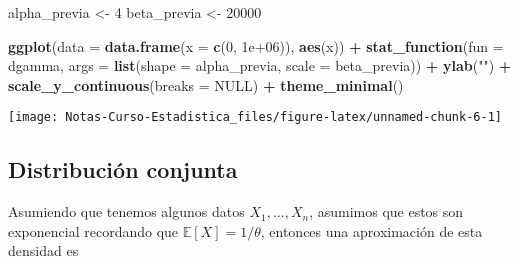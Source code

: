 \documentclass[
  12pt,
]{book}
\newenvironment{Shaded}{\begin{snugshade}}{\end{snugshade}}
\newcommand{\DataTypeTok}[1]{\textcolor[rgb]{0.13,0.29,0.53}{#1}}
\newcommand{\DecValTok}[1]{\textcolor[rgb]{0.00,0.00,0.81}{#1}}
\newcommand{\FloatTok}[1]{\textcolor[rgb]{0.00,0.00,0.81}{#1}}
\newcommand{\KeywordTok}[1]{\textcolor[rgb]{0.13,0.29,0.53}{\textbf{#1}}}
\newcommand{\NormalTok}[1]{#1}
\newcommand{\OperatorTok}[1]{\textcolor[rgb]{0.81,0.36,0.00}{\textbf{#1}}}
\newcommand{\OtherTok}[1]{\textcolor[rgb]{0.56,0.35,0.01}{#1}}
\newcommand{\StringTok}[1]{\textcolor[rgb]{0.31,0.60,0.02}{#1}}
\begin{document}
\begin{Shaded}
\begin{Highlighting}[]
\NormalTok{alpha\_previa \textless{}{-}}\StringTok{ }\DecValTok{4}
\NormalTok{beta\_previa \textless{}{-}}\StringTok{ }\DecValTok{20000}

\KeywordTok{ggplot}\NormalTok{(}\DataTypeTok{data =} \KeywordTok{data.frame}\NormalTok{(}\DataTypeTok{x =} \KeywordTok{c}\NormalTok{(}\DecValTok{0}\NormalTok{, }\FloatTok{1e+06}\NormalTok{)), }\KeywordTok{aes}\NormalTok{(x)) }\OperatorTok{+}\StringTok{ }
\StringTok{    }\KeywordTok{stat\_function}\NormalTok{(}\DataTypeTok{fun =}\NormalTok{ dgamma, }\DataTypeTok{args =} \KeywordTok{list}\NormalTok{(}\DataTypeTok{shape =}\NormalTok{ alpha\_previa, }
        \DataTypeTok{scale =}\NormalTok{ beta\_previa)) }\OperatorTok{+}\StringTok{ }\KeywordTok{ylab}\NormalTok{(}\StringTok{""}\NormalTok{) }\OperatorTok{+}\StringTok{ }\KeywordTok{scale\_y\_continuous}\NormalTok{(}\DataTypeTok{breaks =} \OtherTok{NULL}\NormalTok{) }\OperatorTok{+}\StringTok{ }
\StringTok{    }\KeywordTok{theme\_minimal}\NormalTok{()}
\end{Highlighting}
\end{Shaded}

\begin{center}\texttt{[image: Notas-Curso-Estadistica\_files/figure-latex/unnamed-chunk-6-1]} \end{center}

\hypertarget{distribuciuxf3n-conjunta}{%
\subsection{Distribución conjunta}\label{distribuciuxf3n-conjunta}}

Asumiendo que tenemos algunos datos \(X_1, ..., X_n\), asumimos que estos son exponencial recordando que \(\mathbb E [X] = 1/\theta\), entonces una aproximación de esta densidad es
\end{document}
